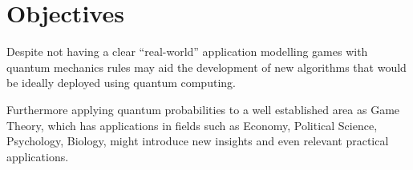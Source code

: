 \section{Objectives}
\label{sec:int_objectives}

Despite not having a clear ``real-world'' application modelling games with quantum mechanics rules may aid the development of new algorithms that would be ideally deployed using quantum computing. 

Furthermore applying quantum probabilities to a well established area as Game Theory, which has applications in fields such as Economy, Political Science, Psychology, Biology, might introduce new insights and even relevant practical applications\cite{Eisert2008}. 
